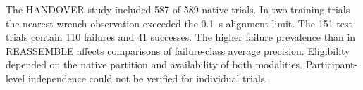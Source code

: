 The HANDOVER study included 587 of 589 native trials. In two training trials the nearest wrench observation exceeded the 0.1~s alignment limit. The 151 test trials contain 110 failures and 41 successes. The higher failure prevalence than in REASSEMBLE affects comparisons of failure-class average precision. Eligibility depended on the native partition and availability of both modalities. Participant-level independence could not be verified for individual trials.
